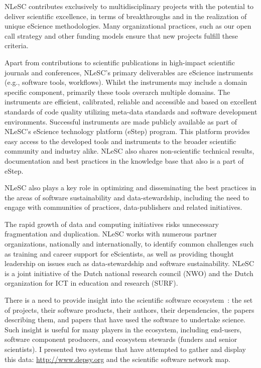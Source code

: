 \documentclass[a4paper,UKenglish]{dagrep}
\begin{document}
NLeSC contributes exclusively to multidisciplinary projects with the
potential to deliver scientific excellence, in terms of breakthroughs
and in the realization of unique eScience methodologies. Many
organizational practices, such as our open call strategy and other
funding models ensure that new projects fulfill these criteria.

Apart from contributions to scientific publications in high-impact
scientific journals and conferences, NLeSC’s primary deliverables are
eScience instruments (e.g., software tools, workflows). Whilst the
instruments may include a domain specific component, primarily these
tools overarch multiple domains. The instruments are efficient,
calibrated, reliable and accessible and based on excellent standards
of code quality utilizing meta-data standards and software development
environments. Successful instruments are made publicly available as
part of NLeSC’s eScience technology platform (eStep) program. This
platform provides easy access to the developed tools and instruments
to the broader scientific community and industry alike. NLeSC also
shares non-scientific technical results, documentation and best
practices in the knowledge base that also is a part of eStep.

NLeSC also plays a key role in optimizing and disseminating the best
practices in the areas of software sustainability and
data-stewardship, including the need to engage with communities of
practices, data-publishers and related initiatives.

The rapid growth of data and computing initiatives risks unnecessary
fragmentation and duplication. NLeSC works with numerous partner
organizations, nationally and internationally, to identify common
challenges such as training and career support for eScientists, as
well as providing thought leadership on issues such as
data-stewardship and software sustainability. NLeSC is a joint
initiative of the Dutch national research council (NWO) and the Dutch
organization for ICT in education and research (SURF).





There is a need to provide insight into the scientific software ecosystem~\cite{bogart_mapping_2015}: the set of projects, their software products, their authors, their dependencies, the papers describing them, and papers that have used the software to undertake science.  Such insight is useful for many players in the ecosystem, including end-users, software component producers, and ecosystem stewards (funders and senior scientists). I presented two systems that have attempted to gather and display this data: \href{depsy.org}{http://www.depsy.org} and the scientific software network map.
\end{document}
